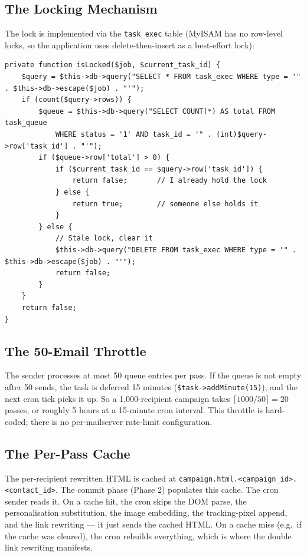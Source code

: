\documentclass[11pt,a4paper]{article}
\begin{document}
\subsection{The Locking Mechanism}

The lock is implemented via the \texttt{task\_exec} table
(MyISAM has no row-level locks, so the application uses
delete-then-insert as a best-effort lock):

\begin{lstlisting}[caption={\texttt{CronSend::isLocked()} --- the lock check.},label={lst:is-locked}]
private function isLocked($job, $current_task_id) {
    $query = $this->db->query("SELECT * FROM task_exec WHERE type = '" . $this->db->escape($job) . "'");
    if (count($query->rows)) {
        $queue = $this->db->query("SELECT COUNT(*) AS total FROM task_queue
            WHERE status = '1' AND task_id = '" . (int)$query->row['task_id'] . "'");
        if ($queue->row['total'] > 0) {
            if ($current_task_id == $query->row['task_id']) {
                return false;       // I already hold the lock
            } else {
                return true;        // someone else holds it
            }
        } else {
            // Stale lock, clear it
            $this->db->query("DELETE FROM task_exec WHERE type = '" . $this->db->escape($job) . "'");
            return false;
        }
    }
    return false;
}
\end{lstlisting}

\subsection{The 50-Email Throttle}

The sender processes at most 50 queue entries per pass. If the
queue is not empty after 50 sends, the task is deferred 15 minutes
(\texttt{\$task->addMinute(15)}), and the next cron tick picks it
up. So a 1,000-recipient campaign takes
$\lceil 1000/50 \rceil = 20$ passes, or roughly 5 hours at a
15-minute cron interval. This throttle is hard-coded; there is no
per-mailserver rate-limit configuration.

\subsection{The Per-Pass Cache}

The per-recipient rewritten HTML is cached at
\texttt{campaign.html.<campaign\_id>.<contact\_id>}. The commit
phase (Phase 2) populates this cache. The cron sender reads it.
On a cache hit, the cron skips the DOM parse, the personalisation
substitution, the image embedding, the tracking-pixel append, and
the link rewriting --- it just sends the cached HTML. On a cache
miss (e.g.\ if the cache was cleared), the cron rebuilds
everything, which is where the double link rewriting manifests.
\end{document}
